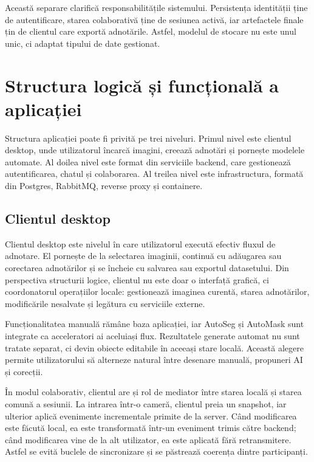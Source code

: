 Această separare clarifică responsabilitățile sistemului.
Persistența identității ține de autentificare, starea colaborativă ține de sesiunea activă, iar artefactele finale țin de clientul care exportă adnotările.
Astfel, modelul de stocare nu este unul unic, ci adaptat tipului de date gestionat.

\section{Structura logică și funcțională a aplicației}
\label{sec:structura-logica-functionala}

Structura aplicației poate fi privită pe trei niveluri.
Primul nivel este clientul desktop, unde utilizatorul încarcă imagini, creează adnotări și pornește modelele automate.
Al doilea nivel este format din serviciile backend, care gestionează autentificarea, chatul și colaborarea.
Al treilea nivel este infrastructura, formată din Postgres, RabbitMQ, reverse proxy și containere.

\subsection{Clientul desktop}
\label{subsec:client-desktop}

Clientul desktop este nivelul în care utilizatorul execută efectiv fluxul de adnotare.
El pornește de la selectarea imaginii, continuă cu adăugarea sau corectarea adnotărilor și se încheie cu salvarea sau exportul datasetului.
Din perspectiva structurii logice, clientul nu este doar o interfață grafică, ci coordonatorul operațiilor locale: gestionează imaginea curentă, starea adnotărilor, modificările nesalvate și legătura cu serviciile externe.

Funcționalitatea manuală rămâne baza aplicației, iar AutoSeg și AutoMask sunt integrate ca acceleratori ai aceluiași flux.
Rezultatele generate automat nu sunt tratate separat, ci devin obiecte editabile în aceeași stare locală.
Această alegere permite utilizatorului să alterneze natural între desenare manuală, propuneri AI și corecții.

În modul colaborativ, clientul are și rol de mediator între starea locală și starea comună a sesiunii.
La intrarea într-o cameră, clientul preia un snapshot, iar ulterior aplică evenimente incrementale primite de la server.
Când modificarea este făcută local, ea este transformată într-un eveniment trimis către backend; când modificarea vine de la alt utilizator, ea este aplicată fără retransmitere.
Astfel se evită buclele de sincronizare și se păstrează coerența dintre participanți.


